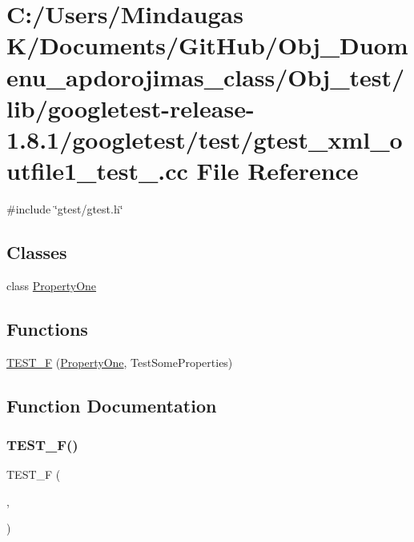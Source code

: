 \hypertarget{_obj__test_2lib_2googletest-release-1_88_81_2googletest_2test_2gtest__xml__outfile1__test___8cc}{}\section{C\+:/\+Users/\+Mindaugas K/\+Documents/\+Git\+Hub/\+Obj\+\_\+\+Duomenu\+\_\+apdorojimas\+\_\+class/\+Obj\+\_\+test/lib/googletest-\/release-\/1.8.1/googletest/test/gtest\+\_\+xml\+\_\+outfile1\+\_\+test\+\_\+.cc File Reference}
\label{_obj__test_2lib_2googletest-release-1_88_81_2googletest_2test_2gtest__xml__outfile1__test___8cc}
{\ttfamily \#include \char`\"{}gtest/gtest.\+h\char`\"{}}\newline
\subsection*{Classes}
\begin{DoxyCompactItemize}
\item 
class \mbox{\hyperlink{class_property_one}{Property\+One}}
\end{DoxyCompactItemize}
\subsection*{Functions}
\begin{DoxyCompactItemize}
\item 
\mbox{\hyperlink{_obj__test_2lib_2googletest-release-1_88_81_2googletest_2test_2gtest__xml__outfile1__test___8cc_a332e6b360a7975e161b4f4b1e34e2d33}{T\+E\+S\+T\+\_\+F}} (\mbox{\hyperlink{class_property_one}{Property\+One}}, Test\+Some\+Properties)
\end{DoxyCompactItemize}


\subsection{Function Documentation}
\mbox{\label{_obj__test_2lib_2googletest-release-1_88_81_2googletest_2test_2gtest__xml__outfile1__test___8cc_a332e6b360a7975e161b4f4b1e34e2d33}} 
\subsubsection{\texorpdfstring{TEST\_F()}{TEST\_F()}}
{\footnotesize\ttfamily T\+E\+S\+T\+\_\+F (\begin{DoxyParamCaption}\item[{\mbox{\hyperlink{class_property_one}{Property\+One}}}]{,  }\item[{Test\+Some\+Properties}]{ }\end{DoxyParamCaption})}

